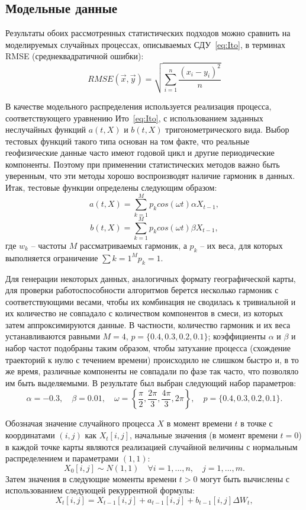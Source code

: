 \subsection{Модельные данные}
\label{sec:ModelData}
Результаты обоих рассмотренных статистических подходов можно сравнить на моделируемых случайных процессах, описываемых СДУ~\eqref{eq:Ito}, в терминах RMSE (среднеквадратичной ошибки):
$$
RMSE(\vec{x}, \vec{y}) = \sqrt{\sum\limits_{i=1}^n \frac{(x_i - y_i)^2}{n}}
$$

В качестве модельного распределения используется реализация процесса, соответствующего уравнению Ито~\eqref{eq:Ito}, с использованием заданных неслучайных функций $a(t,X)$ и $b(t,X)$ тригонометрического вида. Выбор тестовых функций такого типа основан на том факте, что реальные геофизические данные часто имеют годовой цикл и другие периодические компоненты. Поэтому при применении статистических методов важно быть уверенным, что эти методы хорошо воспроизводят наличие гармоник в данных. Итак, тестовые функции определены следующим образом:
$$
a(t, X) = \sum\limits_{k=1}^M p_k cos(\omega t) \alpha X_{t-1},
$$
$$
b(t, X) = \sum\limits_{k=1}^M p_k cos(\omega t) \beta X_{t-1},
$$
где $w_k$ -- частоты $M$ рассматриваемых гармоник, а $p_k$ -- их веса, для которых выполняется ограничение $\sum\limits{k=1}^M p_k = 1$.

Для генерации некоторых данных, аналогичных формату географической карты, для проверки работоспособности алгоритмов берется несколько гармоник с соответствующими весами, чтобы их комбинация не сводилась к тривиальной и их количество не совпадало с количеством компонентов в смеси, из которых затем аппроксимируются данные. В частности, количество гармоник и их веса устанавливаются равными $M=4$, $p=\{0.4,0.3,0.2,0.1\}$; коэффициенты $\alpha$ и $\beta$ и набор частот подобраны таким образом, чтобы затухание процесса (схождение траекторий к нулю с течением времени) происходило не слишком быстро и, в то же время, различные компоненты не совпадали по фазе так часто, что позволяло им быть выделяемыми. В результате был выбран следующий набор параметров:
$$
\alpha = -0.3, \quad \beta = 0.01, \quad \omega = \left\{ \frac{\pi}{2}, \frac{2\pi}{3}, \frac{4\pi}{3}, 2\pi \right\}, \quad p=\{0.4, 0.3, 0.2, 0.1\}.
$$

Обозначая значение случайного процесса $X$ в момент времени $t$ в точке с координатами $(i,j)$ как $X_t[i,j]$, начальные значения (в момент времени $t=0$) в каждой точке карты являются реализацией случайной величины с нормальным распределением и параметрами $(1, 1)$:
$$
X_0[i,j] \sim N(1,1) \quad \forall i=1,...,n, \quad j=1,...,m.
$$
Затем значения в следующие моменты времени $t>0$ могут быть вычислены с использованием следующей рекуррентной формулы:
$$
X_t [i,j]= X_{t-1}[i,j] + a_{t-1} [i,j] + b_{t-1}[i,j]\Delta W_t,
$$

